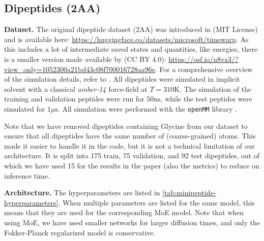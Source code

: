 \subsection{Dipeptides (2AA)} \label{appx:details-dataset-2aa}
\textbf{Dataset.}
The original dipeptide dataset (2AA) was introduced in \cite{klein2023timewarp} (MIT License) and is available here: \url{https://huggingface.co/datasets/microsoft/timewarp}. As this includes a lot of intermediate saved states and quantities, like energies, there is a smaller version made available by \citet{klein2024tbg} (CC BY 4.0):  \url{https://osf.io/n8vz3/?view_only=1052300a21bd43c08f700016728aa96e}. 
For a comprehensive overview of the simulation details, refer to \cite{klein2023timewarp}. All dipeptides were simulated in implicit solvent with a classical \textit{amber-14} force-field at $T=310$K. The simulation of the training and validation peptides were run for $50\textrm{ns}$, while the test peptides were simulated for $1\mu\textrm{s}$. All simulation were performed with the \texttt{openMM} library \citep{eastman2017openmm}.

Note that we have removed dipeptides containing Glycine from our dataset to ensure that all dipeptides have the same number of (coarse-grained) atoms. This made it easier to handle it in the code, but it is not a technical limitation of our architecture. It is split into 175 train, 75 validation, and 92 test dipeptides, out of which we have used 15 for the results in the paper (also the metrics) to reduce on inference time. 

\textbf{Architecture.} The hyperparameters are listed in \cref{tab:minipeptide-hyperparameters}. When multiple parameters are listed for the same model, this means that they are used for the corresponding \gls{MoE} model. Note that when using \gls{MoE}, we have used smaller networks for larger diffusion times, and only the Fokker-Planck regularized model is conservative.

